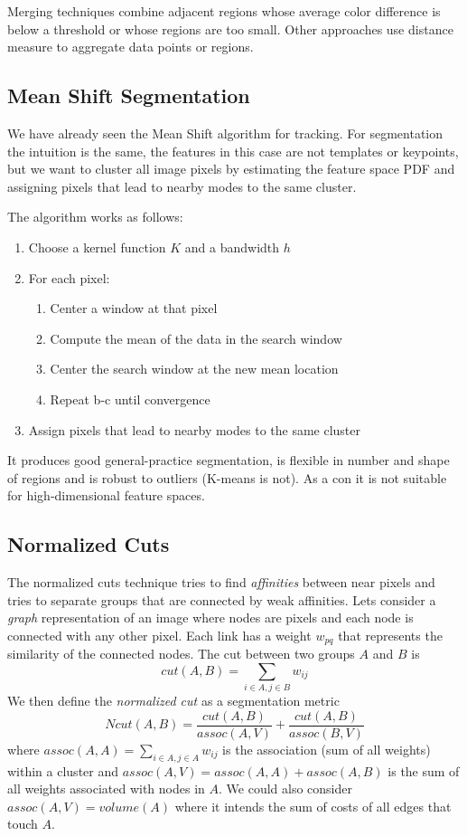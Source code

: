 \documentclass[a4paper,twocolumn]{article}
\begin{document}
Merging techniques combine adjacent regions whose average color difference is
below a threshold or whose regions are too small. Other approaches use distance
measure to aggregate data points or regions.

\subsection{Mean Shift Segmentation}
We have already seen the Mean Shift algorithm for tracking. For segmentation the
intuition is the same, the features in this case are not templates or keypoints,
but we want to cluster all image pixels by estimating the feature space PDF and
assigning pixels that lead to nearby modes to the same cluster.

The algorithm works as follows:
\begin{enumerate}
	\item Choose a kernel function $K$ and a bandwidth $h$
	\item For each pixel:
		\begin{enumerate}
			\item Center a window at that pixel
			\item Compute the mean of the data in the search window
			\item Center the search window at the new mean location
			\item Repeat b-c until convergence
		\end{enumerate}
	\item Assign pixels that lead to nearby modes to the same cluster
\end{enumerate}
It produces good general-practice segmentation, is flexible in number and shape
of regions and is robust to outliers (K-means is not). As a con it is not
suitable for high-dimensional feature spaces.

\subsection{Normalized Cuts}
The normalized cuts technique tries to find \textit{affinities} between near
pixels and tries to separate groups that are connected by weak affinities.
Lets consider a \textit{graph} representation of an image where nodes are pixels
and each node is connected with any other pixel. Each link has a weight
$w_{pq}$ that represents the similarity of the connected nodes. The cut
between two groups $A$ and $B$ is
\begin{equation}
	cut(A,B) = \sum_{i \in A, j \in B} w_{ij}
\end{equation}
We then define the \textit{normalized cut} as a segmentation metric
\begin{equation}
	Ncut(A,B)=\frac{cut(A,B)}{assoc(A,V)}+\frac{cut(A,B)}{assoc(B,V)}
\end{equation}
where $assoc(A,A)=\sum_{i\in A,j\in A}w_{ij}$ is the association (sum of all
weights) within a cluster and $assoc(A,V)=assoc(A,A)+assoc(A,B)$ is the sum of
all weights associated with nodes in $A$. We could also consider
$assoc(A,V)=volume(A)$ where it intends the sum of costs of all edges that touch $A$.
\end{document}
